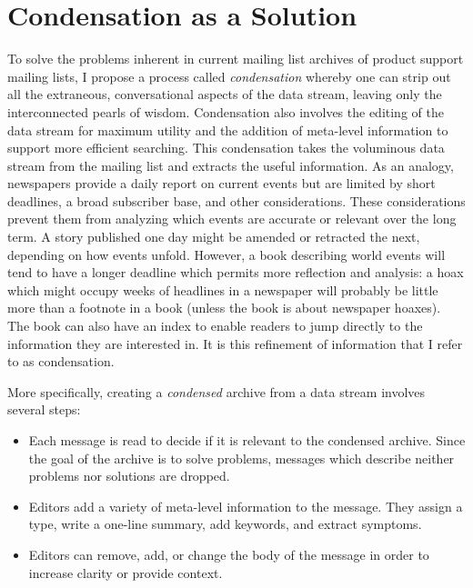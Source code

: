 \section{Condensation as a Solution}
To solve the problems inherent in current mailing list archives of product
support mailing lists, I propose a process called {\em condensation} whereby
one can strip out all the extraneous, conversational aspects of the data
stream, leaving only the interconnected pearls of wisdom. Condensation also
involves the editing of the data stream for maximum utility and the addition of
meta-level information to support more efficient searching. This condensation
takes the voluminous data stream from the mailing list and extracts the useful
information. As an analogy, newspapers provide a daily report on current events
but are limited by short deadlines, a broad subscriber base, and other
considerations. These considerations prevent them from analyzing which events
are accurate or relevant over the long term. A story published one day might be
amended or retracted the next, depending on how events unfold. However, a book
describing world events will tend to have a longer deadline which permits more
reflection and analysis: a hoax which might occupy weeks of headlines in a
newspaper will probably be little more than a footnote in a book (unless the
book is about newspaper hoaxes). The book can also have an index to enable
readers to jump directly to the information they are interested in. It is this
refinement of information that I refer to as condensation.

More specifically, creating a {\it condensed} archive from a data stream
involves several steps:
\begin{itemize}
\item Each message is read to decide if it is relevant to the condensed
archive. Since the goal of the archive is to solve problems, messages which
describe neither problems nor solutions are dropped.
\item Editors add a variety of meta-level information to the message. They
  assign a type, write a one-line summary, add keywords, and extract symptoms.
\item Editors can remove, add, or change the body of the message in order to
increase clarity or provide context.
\end{itemize}

